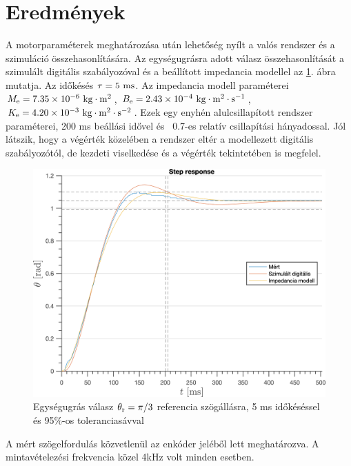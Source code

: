 \section{Eredmények}
A motorparaméterek meghatározása után lehetőség nyílt a valós rendszer és a szimuláció összehasonlítására.
Az egységugrásra adott válasz összehasonlítását a szimulált digitális szabályozóval és a beállított impedancia modellel 
az \ref{fig:step_response_experiment0005}. ábra mutatja. Az időkésés \(\tau = 5~\mathrm{ms}\). Az impedancia modell paraméterei 
\(M_{\mathrm{e}} = 7.35 \times 10^{-6}~\mathrm{kg \cdot m^2}\), \(B_{\mathrm{e}} = 2.43 \times 10^{-4}~\mathrm{kg \cdot m^2 \cdot s^{-1}}\),
\(K_{\mathrm{e}} = 4.20 \times 10^{-3}~\mathrm{kg \cdot m^2 \cdot s^{-2}}\). Ezek egy enyhén alulcsillapított rendszer paraméterei, 
200 ms beállási idővel és ~0.7-es relatív csillapítási hányadossal. Jól látszik, hogy a végérték közelében 
a rendszer eltér a modellezett digitális szabályozótól, de kezdeti viselkedése és a végérték tekintetében is megfelel.
\begin{figure}[H]
    \begin{center}
    \includegraphics[width=\textwidth]{images/step_response_experiment0005.png}
    \caption{Egységugrás válasz \(\theta_{\mathrm{r}} = \pi/3\) referencia szögállásra, 5 ms időkéséssel és 95\%-os toleranciasávval}\label{fig:step_response_experiment0005}
    \end{center}
\end{figure}
A mért szögelfordulás közvetlenül az enkóder jeléből lett meghatározva. A mintavételezési frekvencia közel 4kHz volt 
minden esetben. 

